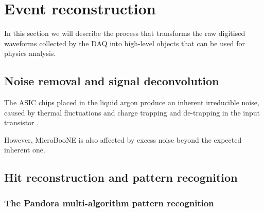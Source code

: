 \chapter{Event reconstruction}

\minitoc

In this section we will describe the process that transforms the raw digitised waveforms collected by the DAQ into high-level objects that can be used for physics analysis. 

\section{Noise removal and signal deconvolution}
The ASIC chips placed in the liquid argon produce an inherent irreducible noise, caused by thermal fluctuations and charge trapping and de-trapping in the input transistor \cite{Acciarri:2017sde}. 

However, MicroBooNE is also affected by excess noise beyond the expected inherent one. 

\section{Hit reconstruction and pattern recognition}

\subsection{The Pandora multi-algorithm pattern recognition}